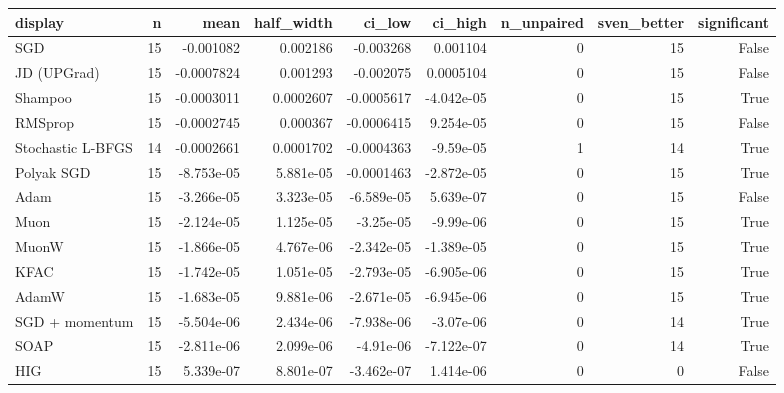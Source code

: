 \begin{tabular}{lrrrrrrrr}
\toprule
display & n & mean & half\_width & ci\_low & ci\_high & n\_unpaired & sven\_better & significant \\
\midrule
SGD & 15 & -0.001082 & 0.002186 & -0.003268 & 0.001104 & 0 & 15 & False \\
JD (UPGrad) & 15 & -0.0007824 & 0.001293 & -0.002075 & 0.0005104 & 0 & 15 & False \\
Shampoo & 15 & -0.0003011 & 0.0002607 & -0.0005617 & -4.042e-05 & 0 & 15 & True \\
RMSprop & 15 & -0.0002745 & 0.000367 & -0.0006415 & 9.254e-05 & 0 & 15 & False \\
Stochastic L-BFGS & 14 & -0.0002661 & 0.0001702 & -0.0004363 & -9.59e-05 & 1 & 14 & True \\
Polyak SGD & 15 & -8.753e-05 & 5.881e-05 & -0.0001463 & -2.872e-05 & 0 & 15 & True \\
Adam & 15 & -3.266e-05 & 3.323e-05 & -6.589e-05 & 5.639e-07 & 0 & 15 & False \\
Muon & 15 & -2.124e-05 & 1.125e-05 & -3.25e-05 & -9.99e-06 & 0 & 15 & True \\
MuonW & 15 & -1.866e-05 & 4.767e-06 & -2.342e-05 & -1.389e-05 & 0 & 15 & True \\
KFAC & 15 & -1.742e-05 & 1.051e-05 & -2.793e-05 & -6.905e-06 & 0 & 15 & True \\
AdamW & 15 & -1.683e-05 & 9.881e-06 & -2.671e-05 & -6.945e-06 & 0 & 15 & True \\
SGD + momentum & 15 & -5.504e-06 & 2.434e-06 & -7.938e-06 & -3.07e-06 & 0 & 14 & True \\
SOAP & 15 & -2.811e-06 & 2.099e-06 & -4.91e-06 & -7.122e-07 & 0 & 14 & True \\
HIG & 15 & 5.339e-07 & 8.801e-07 & -3.462e-07 & 1.414e-06 & 0 & 0 & False \\
\bottomrule
\end{tabular}
